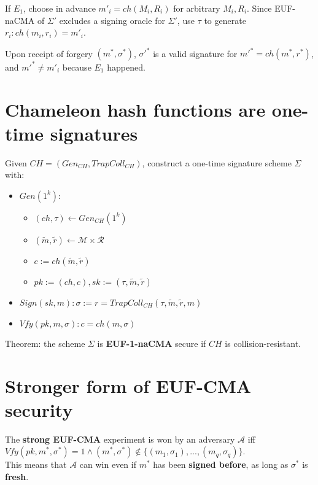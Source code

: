 \documentclass[oneside]{book}
\newcommand{\cA}[0]{\mathcal{A}}
\begin{document}
If $E_1$, choose in advance $m'_i = ch(M_i,R_i)$ for arbitrary $M_i, R_i$. Since EUF-naCMA of $\Sigma'$ excludes a signing oracle for $\Sigma'$, use $\tau$ to generate $r_i: ch(m_i,r_i) = m'_i$.

Upon receipt of forgery $(m^*, \sigma^*)$, $\sigma'^*$ is a valid signature for $m'^* = ch(m^*, r^*)$, and $m'^* \neq m'_i$ because $E_1$ happened.

\section{Chameleon hash functions are one-time signatures}
Given $CH = (Gen_{CH}, TrapColl_{CH})$, construct a one-time signature scheme $\Sigma$ with:
\begin{itemize}
    \item $Gen(1^k): $
    \begin{itemize}
        \item $(ch, \tau) \leftarrow Gen_{CH}(1^k)$
        \item $(\widetilde{m}, \widetilde{r}) \leftarrow \mathcal{M} \times \mathcal{R}$
        \item $c := ch(\widetilde{m}, \widetilde{r})$
        \item $pk := (ch,c), sk := (\tau, \widetilde{m}, \widetilde{r})$
    \end{itemize}
    \item $Sign(sk, m): \sigma := r = TrapColl_{CH}(\tau, \widetilde{m}, \widetilde{r}, m)$
    \item $Vfy(pk, m, \sigma): c = ch(m, \sigma)$
\end{itemize}

Theorem: the scheme $\Sigma$ is \textbf{EUF-1-naCMA} secure if $CH$ is collision-resistant.

\section{Stronger form of EUF-CMA security}
The \textbf{strong EUF-CMA} experiment is won by an adversary $\cA$ iff $Vfy(pk, m^*, \sigma^*) = 1 \land (m^*, \sigma^*) \notin \{(m_1,\sigma_1), ..., (m_q, \sigma_q)\}$.\\

This means that $\cA$ can win even if $m^*$ has been \textbf{signed before}, as long as $\sigma^*$ is \textbf{fresh}.\\
\end{document}
